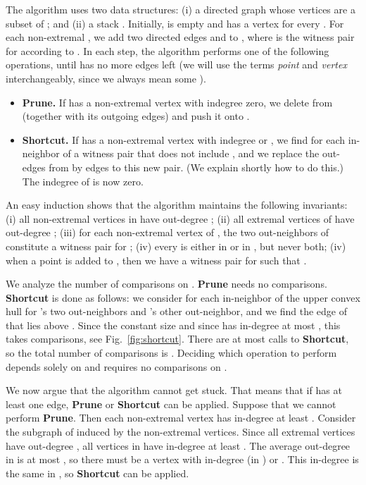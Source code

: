 \documentclass[letterpaper,11pt]{article}
\begin{document}
The algorithm uses two data structures: 
(i) a directed graph  whose vertices 
are a subset of ; and (ii) a stack .  
Initially,  is empty and  has 
a vertex for every . For each 
non-extremal , we add 
two directed edges  and  to , 
where  is the witness pair 
for  according to . 
In each step, the algorithm performs 
one of the following operations, until 
 has no more edges left (we will 
use the terms \emph{point} and 
\emph{vertex} interchangeably, since 
we always mean some ).
\begin{itemize}
  \item \textbf{Prune.} If  has 
    a non-extremal vertex  with 
    indegree zero, we delete  from 
     (together with its outgoing
    edges) and push it onto .
	
  \item \textbf{Shortcut.} If  
    has a non-extremal vertex  with
     indegree  or , we find 
     for each in-neighbor  of  
     a witness pair that does not include 
     , and we replace the out-edges 
     from  by edges to this 
     new pair. (We explain shortly 
     how to do this.) The indegree of 
      is now zero. 
\end{itemize}
An easy induction shows that the 
algorithm maintains the following 
invariants: (i) all non-extremal 
vertices in  have out-degree ; 
(ii) all extremal vertices of  
have out-degree ; (iii) for 
each non-extremal vertex  of , 
the two out-neighbors of  
constitute a witness pair for ; 
(iv) every  is either in  
or in , but never both; (iv) when 
a point  is added to , then 
we have a witness pair  for 
 such that . 

We analyze the number of comparisons 
on . \textbf{Prune} needs no 
comparisons.  \textbf{Shortcut} is 
done as follows: we consider for each
in-neighbor  of  the upper convex 
hull  for 's two out-neighbors
and 's other out-neighbor, and we 
find the edge of  that lies above 
. Since the  constant size and 
since  has in-degree at most , 
this takes  comparisons,
see Fig.~\ref{fig:shortcut}.
There are at most  calls to
\textbf{Shortcut}, so the total number 
of comparisons is .  Deciding which 
operation to perform depends solely on 
 and requires no comparisons on . 

We now argue that the algorithm cannot get 
stuck. That means that if  has at 
least one edge, \textbf{Prune} or 
\textbf{Shortcut} can be applied. 
Suppose that we cannot perform 
\textbf{Prune}. Then each non-extremal 
vertex has in-degree at least . 
Consider the subgraph  of  
induced by the non-extremal vertices. 
Since all extremal vertices have out-degree ,
all vertices in  have in-degree 
at least . The average out-degree 
in  is at most , so there must be 
a vertex with in-degree (in )  or 
.  This in-degree is the same in , 
so \textbf{Shortcut} can be applied.
\end{document}

